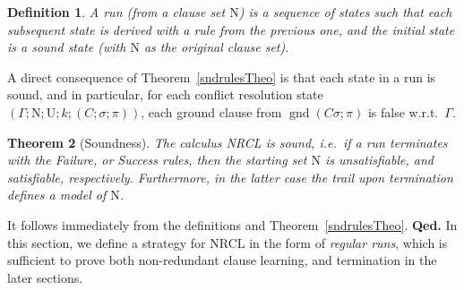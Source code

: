 \documentclass[a4paper]{article}
\newcommand{\mGnd}{\operatorname{gnd}} \newcommand{\mLVar}{\operatorname{lvar}} \newcommand{\mRVar}{\operatorname{rvar}} \newcommand{\mDmn}{\operatorname{dom}} \newcommand{\mRng}{\operatorname{rng}} \newcommand{\mMGU}{\operatorname{mgu}} \newcommand{\mDef}{\operatorname{def}} \newcommand{\mDomain}{\mathcal{D}} \newcommand{\mVar}{\operatorname{var}}
\newcommand{\startproof}{{\bf Proof:~}}
\newcommand{\finishproof}{{\bf Qed.}}
\newtheorem{defi}{Definition}[section]
\newtheorem{theo}[defi]{Theorem}
\begin{document}
\begin{defi}
A \emph{run} (from a clause set $\text{N}$) is a sequence of states such that each subsequent state is derived with a rule from the previous one, and the initial state is a
sound state (with $\text{N}$ as the original clause set).
\end{defi}

A direct consequence of Theorem~\ref{sndrulesTheo} is that each state in a run is sound, and in particular, for each conflict resolution state 
$(\Gamma; \text{N}; \text{U}; k; (C; \sigma; \pi))$, each ground clause from $\mGnd(C\sigma; \pi)$ is false w.r.t.\ $\Gamma$.



\begin{theo}[Soundness]\label{sndRunTheo}
The calculus NRCL is sound, i.e.\ if a run terminates with the \emph{Failure}, or \emph{Success} rules, 
then the starting set $\text{N}$ is unsatisfiable, and satisfiable, respectively.
Furthermore, in the latter case the trail upon termination defines a model of $\text{N}$.
\end{theo}
\noindent\startproof
It follows immediately from the definitions and Theorem~\ref{sndrulesTheo}.
\finishproof
In this section, we define a strategy for NRCL in the form of \emph{regular runs}, which is sufficient to prove both
non-redundant clause learning, and termination in the later sections. 
\end{document}
